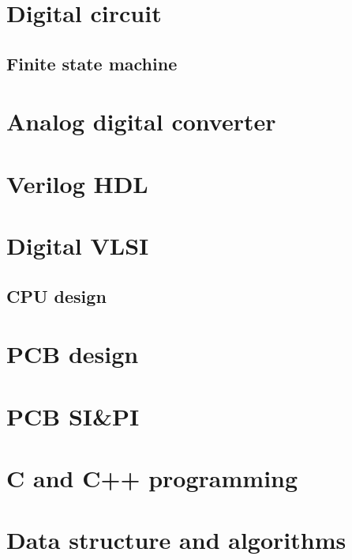 \documentclass[12pt,a4paper,UTF8]{ctexbook}
\begin{document}
	
	
	\part{Digital circuit}
	\label{Digital circuit}
	
	\begin{comment} 
	rather stupid, but helpful 
	\end{comment}
	
	\chapter{Finite state machine}
	\label{Finite state machine}
	
	\part{Analog digital converter}
	\label{Analog digital converter}
	
	
	\part{Verilog HDL}
	\label{Verilog HDL}
	
	\part{Digital VLSI}
	\label{Digital VLSI}
	\chapter{CPU design}
	\label{CPU design}
	
	\part{PCB design}
	\label{PCB design}
	
	\part{PCB SI\&PI}
	
	\part{C and C++ programming}
	
	\part{Data structure and algorithms}
	
\end{document}
